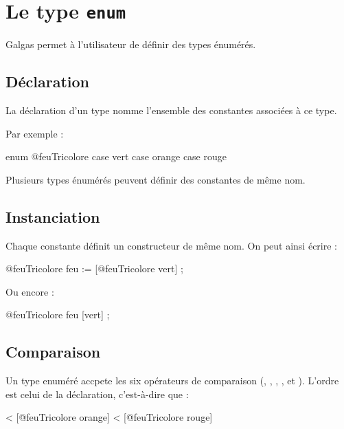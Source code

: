 
\chapter{Le type \texttt{enum}}

Galgas permet à l'utilisateur de définir des types énumérés.

\section{Déclaration}

La déclaration d'un type  nomme l'ensemble des constantes associées à ce type.

Par exemple :

\begin{galgascode}
enum @feuTricolore {
  case vert
  case orange
  case rouge
}
\end{galgascode}

Plusieurs types énumérés peuvent définir des constantes de même nom.

\section{Instanciation}

Chaque constante définit un constructeur de même nom. On peut ainsi écrire :

\begin{galgascode}
@feuTricolore feu := [@feuTricolore vert] ;
\end{galgascode}

Ou encore :

\begin{galgascode}
@feuTricolore feu [vert] ;
\end{galgascode}

\section{Comparaison}

Un type enuméré accpete les six opérateurs de comparaison (\galgas{==}, \galgas{\!=}, \galgas{<}, \galgas{<=}, \galgas{>} et \galgas{>}). L'ordre est celui de la déclaration, c'est-à-dire que :
\begin{galgascode}
   < [@feuTricolore orange] < [@feuTricolore rouge]
\end{galgascode}



